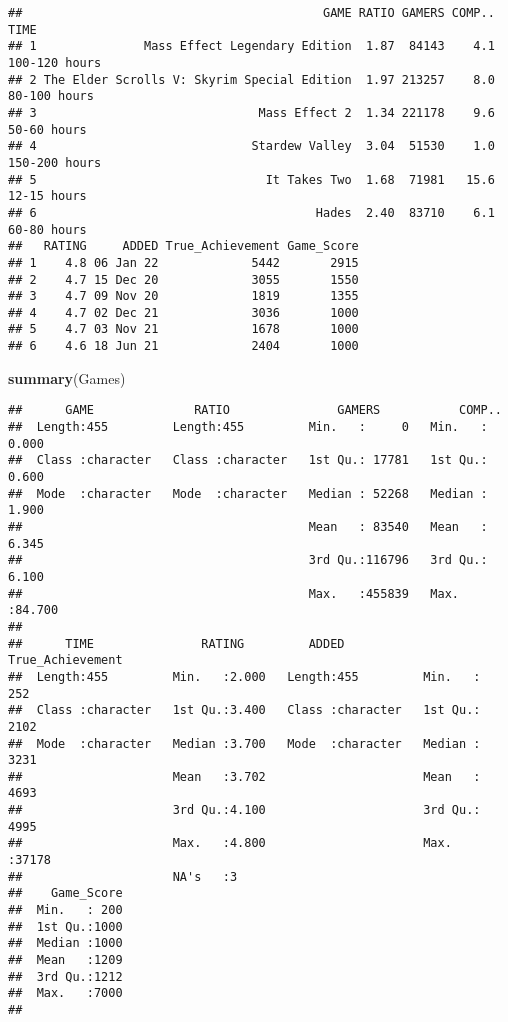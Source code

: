 \documentclass[
]{article}
\newenvironment{Shaded}{\begin{snugshade}}{\end{snugshade}}
\newcommand{\KeywordTok}[1]{\textcolor[rgb]{0.13,0.29,0.53}{\textbf{#1}}}
\newcommand{\NormalTok}[1]{#1}
\begin{document}
\begin{verbatim}
##                                          GAME RATIO GAMERS COMP..          TIME
## 1               Mass Effect Legendary Edition  1.87  84143    4.1 100-120 hours
## 2 The Elder Scrolls V: Skyrim Special Edition  1.97 213257    8.0  80-100 hours
## 3                               Mass Effect 2  1.34 221178    9.6   50-60 hours
## 4                              Stardew Valley  3.04  51530    1.0 150-200 hours
## 5                                It Takes Two  1.68  71981   15.6   12-15 hours
## 6                                       Hades  2.40  83710    6.1   60-80 hours
##   RATING     ADDED True_Achievement Game_Score
## 1    4.8 06 Jan 22             5442       2915
## 2    4.7 15 Dec 20             3055       1550
## 3    4.7 09 Nov 20             1819       1355
## 4    4.7 02 Dec 21             3036       1000
## 5    4.7 03 Nov 21             1678       1000
## 6    4.6 18 Jun 21             2404       1000
\end{verbatim}

\begin{Shaded}
\begin{Highlighting}[]
\KeywordTok{summary}\NormalTok{(Games)}
\end{Highlighting}
\end{Shaded}

\begin{verbatim}
##      GAME              RATIO               GAMERS           COMP..      
##  Length:455         Length:455         Min.   :     0   Min.   : 0.000  
##  Class :character   Class :character   1st Qu.: 17781   1st Qu.: 0.600  
##  Mode  :character   Mode  :character   Median : 52268   Median : 1.900  
##                                        Mean   : 83540   Mean   : 6.345  
##                                        3rd Qu.:116796   3rd Qu.: 6.100  
##                                        Max.   :455839   Max.   :84.700  
##                                                                         
##      TIME               RATING         ADDED           True_Achievement
##  Length:455         Min.   :2.000   Length:455         Min.   :  252   
##  Class :character   1st Qu.:3.400   Class :character   1st Qu.: 2102   
##  Mode  :character   Median :3.700   Mode  :character   Median : 3231   
##                     Mean   :3.702                      Mean   : 4693   
##                     3rd Qu.:4.100                      3rd Qu.: 4995   
##                     Max.   :4.800                      Max.   :37178   
##                     NA's   :3                                          
##    Game_Score  
##  Min.   : 200  
##  1st Qu.:1000  
##  Median :1000  
##  Mean   :1209  
##  3rd Qu.:1212  
##  Max.   :7000  
## 
\end{verbatim}
\end{document}
